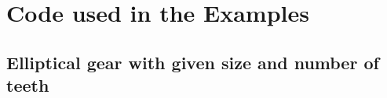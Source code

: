 \documentclass[12pt,a4paper]{scrartcl}
\numberwithin{equation}{section}
\numberwithin{myalgctr}{section}
\numberwithin{mytheoremctr}{section}
\numberwithin{myexamplectr}{subsection}
\begin{document}
	
	\newpage
	\appendix
	\section{Code used in the Examples}\label{appendix:code}
	\subsection{Elliptical gear with given size and number of teeth}\label{appendix:ell-gear-code}
	
	\newpage 
	\thispagestyle{firststyle}
	\newpage
	\printbibliography
	\listoffigures
	\thispagestyle{firststyle}
	
	\newpage
	\appendix
	\newpage
	
	
\end{document}
